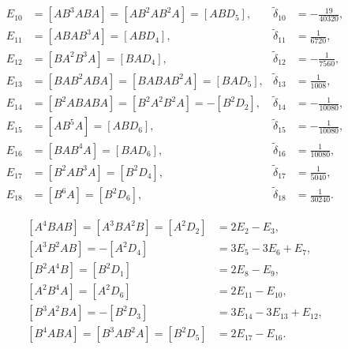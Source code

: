 \documentclass[12pt]{article}
\begin{document}
\begin{equation}
  \begin{aligned}
    \nonumber
    E_{10} &= \left [ A B^{3} A B A \right ] = \left [ A B^{2} A B^{2} A \right ] = \left [ A B D_{5} \right ], & \tilde{\delta}_{10} &= -\frac{19}{40 320}, \\
    E_{11} &= \left [ A B A B^{3} A \right ] = \left [ A B D_{4} \right ], & \tilde{\delta}_{11} &= \frac{1}{6720}, \\
    E_{12} &= \left [ B A^{2} B^{3} A \right ] = \left [ B A D_{4} \right ], & \tilde{\delta}_{12} &= -\frac{1}{7560}, \\
    E_{13} &= \left [ B A B^{2} A B A \right ] = \left [ B A B A B^{2} A \right ] = \left [ B A D_{5} \right ], & \tilde{\delta}_{13} &= \frac{1}{1008}, \\
    E_{14} &= \left [ B^{2} A B A B A \right ] = \left [ B^{2} A^{2} B^{2} A \right ] = -\left [ B^{2} D_{2} \right ], & \tilde{\delta}_{14} &= -\frac{1}{10 080}, \\
    E_{15} &= \left [ A B^{5} A \right ] = \left [ A B D_{6} \right ], & \tilde{\delta}_{15} &= -\frac{1}{10 080}, \\
    E_{16} &= \left [ B A B^{4} A \right ] = \left [ B A D_{6} \right ], & \tilde{\delta}_{16} &= \frac{1}{10 080}, \\
    E_{17} &= \left [ B^{2} A B^{3} A \right ] = \left [ B^{2} D_{4} \right ], & \tilde{\delta}_{17} &= \frac{1}{5040}, \\
    E_{18} &= \left [ B^{6} A \right ] = \left [ B^{2} D_{6} \right ], & \tilde{\delta}_{18} &= \frac{1}{30 240}.
  \end{aligned}
\end{equation}

\vspace{0.5cm}

\begin{equation}
  \begin{aligned}
    \nonumber
    \left [ A^{4} B A B \right ] = \left [ A^{3} B A^{2} B \right ] = \left [ A^{2} D_{2} \right ] &= 2 E_{2} - E_{3}, \\
    \left [ A^{3} B^{2} A B \right ] = - \left [ A^{2} D_{4} \right ] &= 3 E_{5} - 3 E_{6} + E_{7}, \\
    \left [ B^{2} A^{4} B \right ] = \left [ B^{2} D_{1} \right ] &= 2 E_{8} - E_{9}, \\
    \left [ A^{2} B^{4} A \right ] = \left [ A^{2} D_{6} \right ] &= 2 E_{11} - E_{10}, \\
    \left [ B^{3} A^{2} B A \right ] = - \left [ B^{2} D_{3} \right ] &= 3 E_{14} - 3 E_{13} + E_{12}, \\
    \left [ B^{4} A B A \right ] = \left [ B^{3} A B^{2} A \right ] = \left [ B^{2} D_{5} \right ] &= 2 E_{17} - E_{16}.
  \end{aligned}
\end{equation}
\end{document}
